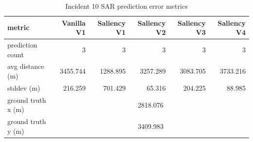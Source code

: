\begin{table}[ht]
\centering
\caption{Incident 10 SAR prediction error metrics}
\label{tab:sar-incident-10}
\begin{tabular}{lrrrrr}
\hline
metric & Vanilla V1 & Saliency V1 & Saliency V2 & Saliency V3 & Saliency V4 \\
\hline
prediction count & 3 & 3 & 3 & 3 & 3 \\
avg distance (m) & 3455.744 & 1288.895 & 3257.289 & 3083.705 & 3733.216 \\
stddev (m) & 216.259 & 701.429 & 65.316 & 204.225 & 88.985 \\
ground truth x (m) & \multicolumn{5}{c}{2818.076} \\
ground truth y (m) & \multicolumn{5}{c}{3409.983} \\
\hline
\end{tabular}
\end{table}
